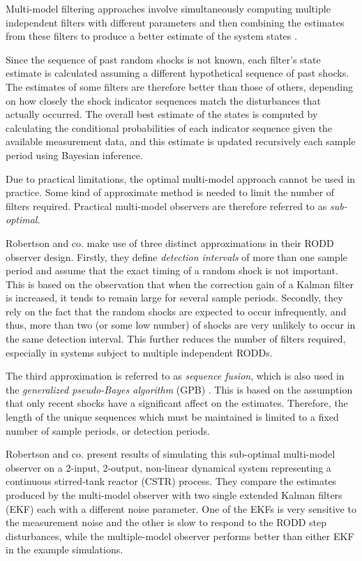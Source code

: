Multi-model filtering approaches involve simultaneously computing multiple independent filters with different parameters and then combining the estimates from these filters to produce a better estimate of the system states \citep{jaffer_estimation_1971, buxbaum_recursive_1969, tugnait_detection_1982}.

Since the sequence of past random shocks is not known, each filter's state estimate is calculated assuming a different hypothetical sequence of past shocks. The estimates of some filters are therefore better than those of others, depending on how closely the shock indicator sequences match the disturbances that actually occurred. The overall best estimate of the states is computed by calculating the conditional probabilities of each indicator sequence given the available measurement data, and this estimate is updated recursively each sample period using Bayesian inference.

Due to practical limitations, the optimal multi-model approach cannot be used in practice. Some kind of approximate method is needed to limit the number of filters required. Practical multi-model observers are therefore referred to as \textit{sub-optimal}.

Robertson and co. make use of three distinct approximations in their RODD observer design. Firstly, they define \textit{detection intervals} of more than one sample period and assume that the exact timing of a random shock is not important. This is based on the observation that when the correction gain of a Kalman filter is increased, it tends to remain large for several sample periods. Secondly, they rely on the fact that the random shocks are expected to occur infrequently, and thus, more than two (or some low number) of shocks are very unlikely to occur in the same detection interval. This further reduces the number of filters required, especially in systems subject to multiple independent RODDs.

The third approximation is referred to as \textit{sequence fusion}, which is also used in the \textit{generalized pseudo-Bayes algorithm} (GPB) \citep{buxbaum_recursive_1969, jaffer_estimation_1971, tugnait_detection_1982, gustafsson_estimation_1993}. This is based on the assumption that only recent shocks have a significant affect on the estimates. Therefore, the length of the unique sequences which must be maintained is limited to a fixed number of sample periods, or detection periods.

Robertson and co. present results of simulating this sub-optimal multi-model observer on a 2-input, 2-output, non-linear dynamical system representing a continuous stirred-tank reactor (CSTR) process. They compare the estimates produced by the multi-model observer with two single extended Kalman filters (EKF) each with a different noise parameter. One of the EKFs is very sensitive to the measurement noise and the other is slow to respond to the RODD step disturbances, while the multiple-model observer performs better than either EKF in the example simulations.

